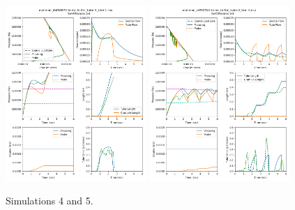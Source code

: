 \documentclass[letterpaper]{article}
\begin{document}
\begin{figure}\centering
\includegraphics[width=0.475\textwidth]{Set4result27-Jul.png}
\includegraphics[width=0.475\textwidth]{Set5result27-Jul.png}
\caption{Simulations 4 and 5.}
\end{figure}
\end{document}
